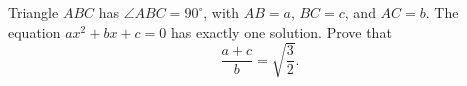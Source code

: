 Triangle $ABC$ has $\angle ABC=90^\circ$, with $AB=a$, $BC=c$, and $AC=b$. The equation $ax^2+bx+c=0$ has exactly one solution. Prove that
\[\dfrac{a+c}{b}=\sqrt{\dfrac{3}{2}}.\]
